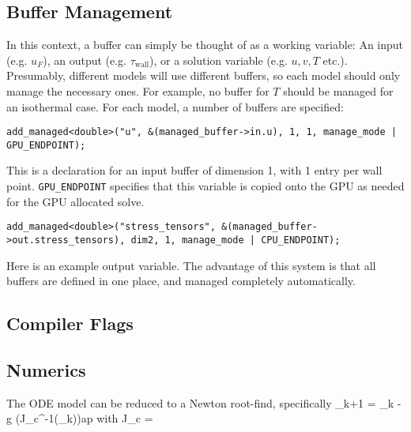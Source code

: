 \documentclass[10pt]{article}
\renewcommand{\sec}[1]{\subsection*{#1}}
\begin{document}


	\sec{Buffer Management}

	In this context, a buffer can simply be thought of as a working variable: An input (e.g. $u_F$), an output (e.g. $\tau_{\textrm{wall}}$), or a solution variable (e.g. $u,v,T$ etc.).
	Presumably, different models will use different buffers, so each model should only manage the necessary ones. For example, no buffer for $T$ should be managed for an isothermal case.
	For each model, a number of buffers are specified:

	\begin{center}
	\texttt{add\_managed<double>("u", \&(managed\_buffer->in.u), 1, 1, manage\_mode | GPU\_ENDPOINT);}
	\end{center}

	This is a declaration for an input buffer of dimension 1, with 1 entry per wall point. \texttt{GPU\_ENDPOINT} specifies that this variable is copied onto the GPU as needed for the GPU
	allocated solve.

	\begin{center}
	\texttt{add\_managed<double>("stress\_tensors", \&(managed\_buffer->out.stress\_tensors), dim2, 1, manage\_mode | CPU\_ENDPOINT);}
	\end{center}

	Here is an example output variable. The advantage of this system is that all buffers are defined in one place, and managed completely automatically.

	\sec{Compiler Flags}

	\sec{Numerics}

	The ODE model can be reduced to a Newton root-find, specifically
	\equat
	{
		_{k+1} = _k - \beta g \Big(J_c^{-1}(_k)\Big)ap
	}
	with
	\equat
	{
		J_c =
	}
\end{document}

